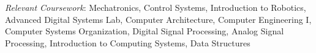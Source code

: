 	{\sl Relevant Coursework}: Mechatronics, Control Systems, Introduction
	to Robotics, Advanced Digital Systems Lab, Computer Architecture,
	Computer Engineering I, Computer Systems Organization, Digital Signal
	Processing, Analog Signal Processing, Introduction to Computing
	Systems, Data Structures
